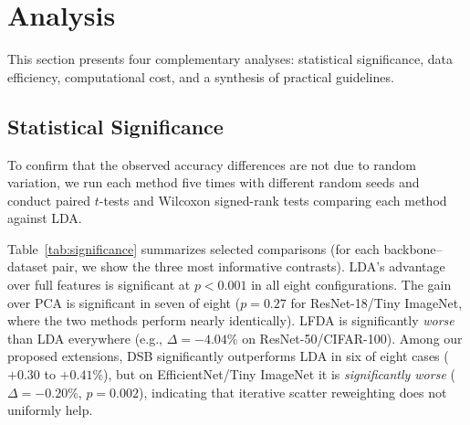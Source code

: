 \section{Analysis}
\label{sec:analysis}

This section presents four complementary analyses: statistical significance, data efficiency, computational cost, and a synthesis of practical guidelines.

\subsection{Statistical Significance}
\label{sec:significance}

To confirm that the observed accuracy differences are not due to random variation, we run each method five times with different random seeds and conduct paired $t$-tests and Wilcoxon signed-rank tests comparing each method against LDA.

Table~\ref{tab:significance} summarizes selected comparisons (for each backbone--dataset pair, we show the three most informative contrasts). LDA's advantage over full features is significant at $p < 0.001$ in all eight configurations. The gain over PCA is significant in seven of eight ($p = 0.27$ for ResNet-18/Tiny ImageNet, where the two methods perform nearly identically). LFDA is significantly \emph{worse} than LDA everywhere (e.g., $\Delta = -4.04\%$ on ResNet-50/CIFAR-100). Among our proposed extensions, DSB significantly outperforms LDA in six of eight cases ($+0.30$ to $+0.41\%$), but on EfficientNet/Tiny ImageNet it is \emph{significantly worse} ($\Delta = -0.20\%$, $p = 0.002$), indicating that iterative scatter reweighting does not uniformly help.

